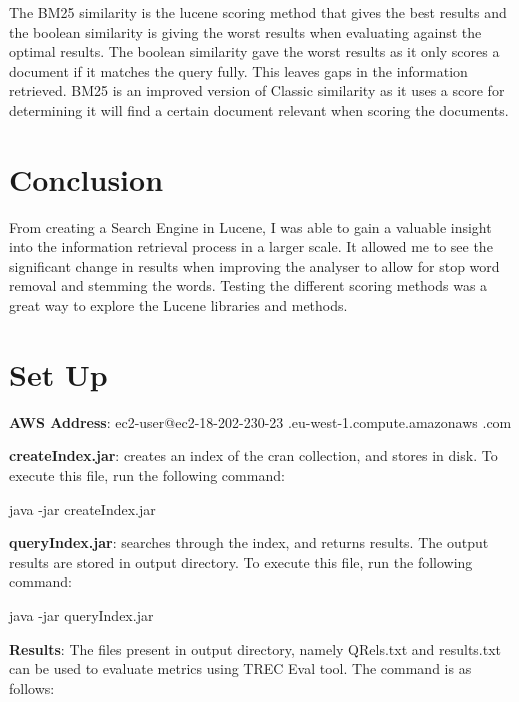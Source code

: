\newpage	
The BM25 similarity is the lucene scoring method that gives the best results and the boolean similarity is giving the worst results when evaluating against the optimal results. The boolean similarity gave the worst results as it only scores a document if it matches the query fully. This leaves gaps in the information retrieved. BM25 is an improved version of Classic similarity as it uses a score for determining it will find a certain document relevant when scoring the documents. \par 

\section{Conclusion}
From creating a Search Engine in Lucene, I was able to gain a valuable insight into the information retrieval process in a larger scale. It allowed me to see the significant change in results when improving the analyser to allow for stop word removal and stemming  the words. Testing the different scoring methods was a great way to explore the Lucene libraries and methods.\par 

\section{Set Up}

\textbf{AWS Address}: \newline ec2-user@ec2-18-202-230-23
.eu-west-1.compute.amazonaws \newline .com \newline


\noindent \textbf{createIndex.jar}: creates an index of the cran collection, and stores in disk. To execute this file, run the following command:

\begin{center} 
 java -jar createIndex.jar \newline
\end{center}

\noindent \textbf{queryIndex.jar}: searches through the index, and returns results. The output results are stored in output directory. To execute this file, run the following command:

\begin{center} 
 java -jar queryIndex.jar \newline
\end{center}

\noindent \textbf{Results}: The files present in output directory, namely QRels.txt and results.txt can be used to evaluate metrics using TREC Eval tool. The command is as follows:

